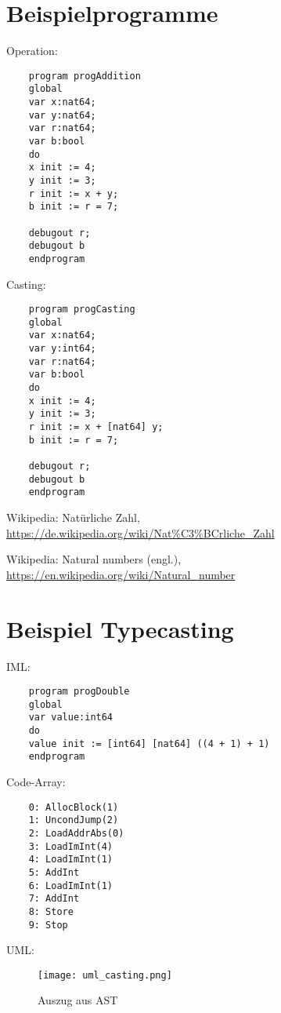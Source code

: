 \documentclass[10pt, a4paper, twocolumn]{article} %
\begin{document}
\section{Beispielprogramme}
\label{sec:prog}
Operation:
\begin{lstlisting}
    program progAddition
    global
    var x:nat64;
    var y:nat64;
    var r:nat64;
    var b:bool
    do
    x init := 4;
    y init := 3;
    r init := x + y;
    b init := r = 7;

    debugout r;
    debugout b
    endprogram
\end{lstlisting}
Casting:
\begin{lstlisting}
    program progCasting
    global
    var x:nat64;
    var y:int64;
    var r:nat64;
    var b:bool
    do
    x init := 4;
    y init := 3;
    r init := x + [nat64] y;
    b init := r = 7;

    debugout r;
    debugout b
    endprogram
\end{lstlisting}


\begin{thebibliography}{9}
    Wikipedia: Natürliche Zahl,
    \url{https://de.wikipedia.org/wiki/Nat\%C3\%BCrliche_Zahl}

    Wikipedia: Natural numbers (engl.),
    \url{https://en.wikipedia.org/wiki/Natural_number}
\end{thebibliography}

\newpage
\appendix
\section{Beispiel Typecasting}
\label{bsp_casting}
IML:
\begin{lstlisting}
    program progDouble
    global
    var value:int64
    do
    value init := [int64] [nat64] ((4 + 1) + 1)
    endprogram
\end{lstlisting}

Code-Array:
\begin{lstlisting}
    0: AllocBlock(1)
    1: UncondJump(2)
    2: LoadAddrAbs(0)
    3: LoadImInt(4)
    4: LoadImInt(1)
    5: AddInt
    6: LoadImInt(1)
    7: AddInt
    8: Store
    9: Stop
\end{lstlisting}

UML:
\begin{figure}[H]
    \texttt{[image: uml\_casting.png]} %
    \caption{Auszug aus AST } %
    \label{casting}
\end{figure}


\end{document}
